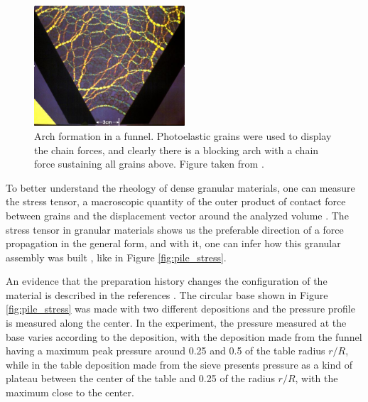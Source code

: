 \begin{figure}[H]
    \centering
    \includegraphics[width=0.5\textwidth]{04-figuras/hopperforcechain.jpg}
    \caption[Arch in a funnel.]{Arch formation in a funnel. Photoelastic grains were used to display the chain forces, and clearly there is a blocking arch with a chain force sustaining all grains above. Figure taken from \cite{Duke_Physics}.}
    \label{fig:arch_chain}
\end{figure}

    To better understand the rheology of dense granular materials, one can measure the stress tensor, a macroscopic quantity of the outer product of contact force between grains and the displacement vector around the analyzed volume \cite{Granular_Physics, Nathalia-Dissertacao, Leticia-Dissertacao, Fabiola-Dissertacao, Force_Chains_Micro_Macro}. The stress tensor in granular materials shows us the preferable direction of a force propagation in the general form, and with it, one can infer how this granular assembly was built \cite{Memories_in_Sand}, like in Figure \ref{fig:pile_stress}.

    An evidence that the preparation history changes the configuration of the material is described in the references \cite{Memories_in_Sand, Sensitivity_of_Stress_Response_Function_to_Packing_Preparation}. The circular base shown in Figure \ref{fig:pile_stress} was made with two different depositions and the pressure profile is measured along the center. In the experiment, the pressure measured at the base varies according to the deposition, with the deposition made from the funnel having a maximum peak pressure around 0.25 and 0.5 of the table radius $r/R$, while in the table deposition made from the sieve presents pressure as a kind of plateau between the center of the table and 0.25 of the radius $r/R$, with the maximum close to the center.

